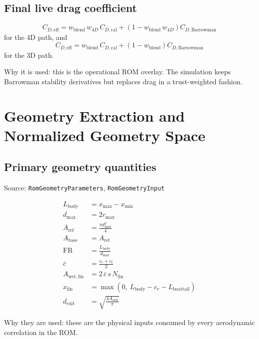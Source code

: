 \documentclass[11pt]{article}
\begin{document}
\subsection{Final live drag coefficient}
\begin{equation*}
C_{D,\mathrm{eff}} = w_{\mathrm{blend}}\,w_{4D}\,C_{D,\mathrm{cal}} + \left(1-w_{\mathrm{blend}}\,w_{4D}\right)C_{D,\mathrm{Barrowman}}
\end{equation*}
for the 4D path, and
\begin{equation*}
C_{D,\mathrm{eff}} = w_{\mathrm{blend}}\,C_{D,\mathrm{cal}} + (1-w_{\mathrm{blend}})C_{D,\mathrm{Barrowman}}
\end{equation*}
for the 3D path.

Why it is used: this is the operational ROM overlay. The simulation keeps Barrowman stability derivatives but replaces drag in a trust-weighted fashion.

\section{Geometry Extraction and Normalized Geometry Space}
\subsection{Primary geometry quantities}
Source: \texttt{RomGeometryParameters}, \texttt{RomGeometryInput}

\begin{align*}
L_{\mathrm{body}} &= x_{\max} - x_{\min} \\
d_{\max} &= 2r_{\max} \\
A_{\mathrm{ref}} &= \frac{\pi d_{\max}^2}{4} \\
A_{\mathrm{base}} &= A_{\mathrm{ref}} \\
\mathrm{FR} &= \frac{L_{\mathrm{body}}}{d_{\max}} \\
\bar c &= \frac{c_r + c_t}{2} \\
A_{\mathrm{wet,fin}} &= 2\,\bar c\,s\,N_{\mathrm{fin}} \\
x_{\mathrm{fin}} &= \max\!\left(0,\ L_{\mathrm{body}} - c_r - L_{\mathrm{boattail}}\right) \\
d_{\mathrm{exit}} &= \sqrt{\frac{4A_{\mathrm{exit}}}{\pi}}
\end{align*}

Why they are used: these are the physical inputs consumed by every aerodynamic correlation in the ROM.
\end{document}
